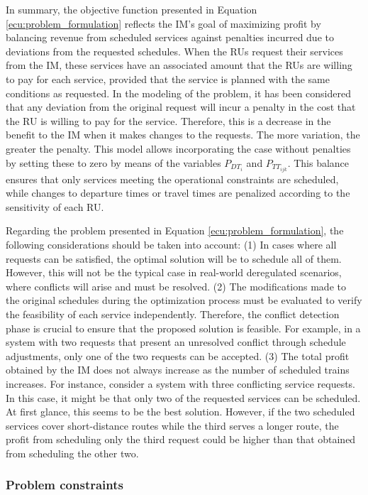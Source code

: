 \documentclass[Afour,sagev,times]{sagej}
\begin{document}
In summary, the objective function presented in Equation \ref{ecu:problem_formulation} reflects the \gls{IM}'s goal of maximizing profit by balancing revenue from scheduled services against penalties incurred due to deviations from the requested schedules. When the \glspl{RU} request their services from the \gls{IM}, these services have an associated amount that the \glspl{RU} are willing to pay for each service, provided that the service is planned with the same conditions as requested. In the modeling of the problem, it has been considered that any deviation from the original request will incur a penalty in the cost that the \gls{RU} is willing to pay for the service. Therefore, this is a decrease in the benefit to the \gls{IM} when it makes changes to the requests. The more variation, the greater the penalty. This model allows incorporating the case without penalties by setting these to zero by means of the variables $P_{{DT}_{{i}}}$ and $P_{TT_{ijk}}$. This balance ensures that only services meeting the operational constraints are scheduled, while changes to departure times or travel times are penalized according to the sensitivity of each \gls{RU}. 

Regarding the problem presented in Equation \ref{ecu:problem_formulation}, the following considerations should be taken into account: (1) In cases where all requests can be satisfied, the optimal solution will be to schedule all of them. However, this will not be the typical case in real-world deregulated scenarios, where conflicts will arise and must be resolved. (2) The modifications made to the original schedules during the optimization process must be evaluated to verify the feasibility of each service independently. Therefore, the conflict detection phase is crucial to ensure that the proposed solution is feasible. For example, in a system with two requests that present an unresolved conflict through schedule adjustments, only one of the two requests can be accepted. (3) The total profit obtained by the \gls{IM} does not always increase as the number of scheduled trains increases. For instance, consider a system with three conflicting service requests. In this case, it might be that only two of the requested services can be scheduled. At first glance, this seems to be the best solution. However, if the two scheduled services cover short-distance routes while the third serves a longer route, the profit from scheduling only the third request could be higher than that obtained from scheduling the other two.

\subsubsection{Problem constraints}
\label{constraints}
\end{document}
